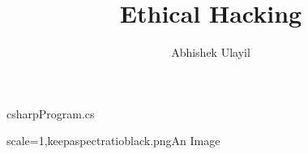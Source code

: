 \documentclass[a4paper,12pt,oneside]{article}
\title{Ethical Hacking}
\author{Abhishek Ulayil}
\begin{document}
\maketitle
\lipsum
\lipsum
\begin{Code}{csharp}{Program.cs}
\end{Code}
\begin{Image}{scale=1,keepaspectratio}{black.png}{An Image}
\end{Image}
\end{document}
